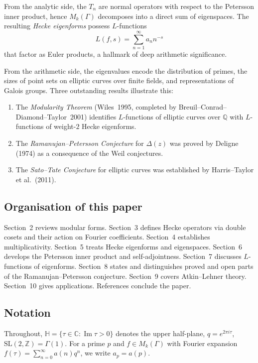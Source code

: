\documentclass[12pt,a4paper]{amsart}
\theoremstyle{definition}
\begin{document}
From the analytic side, the $T_n$ are normal operators with respect to the
Petersson inner product, hence $M_k(\Gamma)$ decomposes into a direct sum
of eigenspaces. The resulting \emph{Hecke eigenforms} possess $L$-functions
\[
  L(f,s) = \sum_{n=1}^{\infty} a_n n^{-s}
\]
that factor as Euler products, a hallmark of deep arithmetic significance.

From the arithmetic side, the eigenvalues encode the distribution of primes,
the sizes of point sets on elliptic curves over finite fields, and
representations of Galois groups. Three outstanding results illustrate this:
\begin{enumerate}[label=(\roman*)]
  \item The \emph{Modularity Theorem} (Wiles~1995, completed by Breuil--Conrad--
        Diamond--Taylor~2001) identifies $L$-functions of elliptic curves over
        $\mathbb{Q}$ with $L$-functions of weight-$2$ Hecke eigenforms.
  \item The \emph{Ramanujan--Petersson Conjecture} for $\Delta(z)$ was proved
        by Deligne (1974) as a consequence of the Weil conjectures.
  \item The \emph{Sato--Tate Conjecture} for elliptic curves was established
        by Harris--Taylor et al.\ (2011).
\end{enumerate}

\subsection*{Organisation of this paper}

Section~2 reviews modular forms. Section~3 defines Hecke operators via double
cosets and their action on Fourier coefficients. Section~4 establishes
multiplicativity. Section~5 treats Hecke eigenforms and eigenspaces.
Section~6 develops the Petersson inner product and self-adjointness.
Section~7 discusses $L$-functions of eigenforms. Section~8 states and
distinguishes proved and open parts of the Ramanujan--Petersson conjecture.
Section~9 covers Atkin--Lehner theory. Section~10 gives applications.
References conclude the paper.

\subsection*{Notation}

Throughout, $\mathbb{H} = \{\tau \in \mathbb{C} : \operatorname{Im}\tau > 0\}$
denotes the upper half-plane, $q = e^{2\pi i \tau}$,
$\mathrm{SL}(2,\mathbb{Z}) = \Gamma(1)$. For a prime $p$ and $f \in M_k(\Gamma)$
with Fourier expansion $f(\tau) = \sum_{n=0}^{\infty} a(n) q^n$, we write
$a_p = a(p)$.
\end{document}
